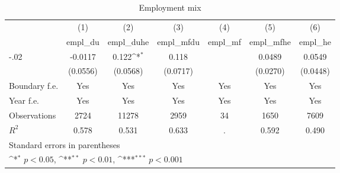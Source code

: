 \begin{table}[htbp]\centering
\def\sym#1{\ifmmode^{#1}\else\(^{#1}\)\fi}
\caption{Employment mix}
\begin{tabular}{l*{6}{c}}
\hline\hline
                    &\multicolumn{1}{c}{(1)}&\multicolumn{1}{c}{(2)}&\multicolumn{1}{c}{(3)}&\multicolumn{1}{c}{(4)}&\multicolumn{1}{c}{(5)}&\multicolumn{1}{c}{(6)}\\
                    &\multicolumn{1}{c}{empl\_du}&\multicolumn{1}{c}{empl\_duhe}&\multicolumn{1}{c}{empl\_mfdu}&\multicolumn{1}{c}{empl\_mf}&\multicolumn{1}{c}{empl\_mfhe}&\multicolumn{1}{c}{empl\_he}\\
\hline
-.02                &     -0.0117         &       0.122\sym{*}  &       0.118         &                     &      0.0489         &      0.0549         \\
                    &    (0.0556)         &    (0.0568)         &    (0.0717)         &                     &    (0.0270)         &    (0.0448)         \\
[1em]
Boundary f.e.       &         Yes         &         Yes         &         Yes         &         Yes         &         Yes         &         Yes         \\
[1em]
Year f.e.           &         Yes         &         Yes         &         Yes         &         Yes         &         Yes         &         Yes         \\
\hline
Observations        &        2724         &       11278         &        2959         &          34         &        1650         &        7609         \\
\(R^{2}\)           &       0.578         &       0.531         &       0.633         &           .         &       0.592         &       0.490         \\
\hline\hline
\multicolumn{7}{l}{\footnotesize Standard errors in parentheses}\\
\multicolumn{7}{l}{\footnotesize \sym{*} \(p<0.05\), \sym{**} \(p<0.01\), \sym{***} \(p<0.001\)}\\
\end{tabular}
\end{table}
